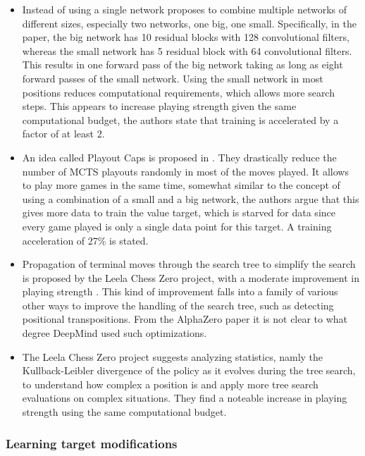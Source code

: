 \documentclass[12pt,onecolumn,oneside,titlepage]{article}
\begin{document}
\begin{itemize}
 \item Instead of using a single network \cite{lan2019multiple} proposes to combine multiple networks of different sizes, especially two networks, one big, one small. Specifically, in the paper, the 
 big network has 10 residual blocks with 128 convolutional filters, whereas the small network has 5 residual block with 64 convolutional filters. This results in one forward pass of the big network taking as long as eight forward passes of the small network.
 Using the small network in most positions reduces computational requirements, 
 which allows more search steps. This appears to increase playing strength given the same computational budget, the authors state that training is accelerated by a factor of at least 2.
 \item An idea called Playout Caps is proposed in \cite{wu2019accelerating}. They drastically reduce the number of MCTS playouts randomly in most of the moves played. It allows to play more games in the same time, somewhat similar to 
 the concept of using a combination of a small and a big network, the authors argue that this gives more data to train the value target, which is starved for data since every game played is only a single data point for this target. A training acceleration of 27\% is stated.
 \item Propagation of terminal moves through the search tree to simplify the search is proposed by the Leela Chess Zero project, with a moderate improvement in playing strength \cite{leela0propagation}. This kind of improvement falls
 into a family of various other ways to improve the handling of the search tree, such as detecting positional transpositions. From the AlphaZero paper it is not clear to what degree DeepMind used such optimizations.
 \item The Leela Chess Zero project suggests analyzing statistics, namly the Kullback-Leibler divergence of the policy as it evolves during the tree search, to understand how complex a position is and apply more tree search evaluations on complex situations. They find a noteable increase
   in playing strength \cite{leela0kldgain} using the same computational budget.
\end{itemize}

\subsubsection{Learning target modifications}
\end{document}

